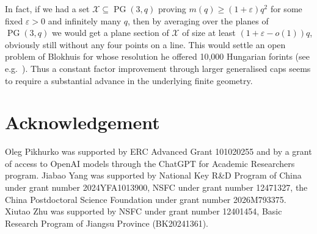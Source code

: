 \documentclass[12pt,a4paper]{article}
\numberwithin{equation}{section}
\theoremstyle{definition}
\theoremstyle{remark}
\newcommand{\hide}[1]{{\color{DarkGreen}#1}}
\renewcommand{\hide}[1]{}
\begin{document}
 \hide{Some details:
 	Hill~\cite{Hill78} improved it to $2q^2-\alpha_q$ where $\alpha_q$ comes from an explicit (but messy) inequality and is linear in $q$, specifically he showed that
 	\begin{equation}\label{eq:H4-Hill-bound}
 		m(q)\le2q^2-\frac{\sqrt{17}-3}{2}\,q+O(1)
 		\quad(q\to\infty);
 	\end{equation}
 	
 	
 	In the other direction, results on cubic surfaces imply
 	\begin{equation}\label{eq:H4-cubic-cap}
 		m(q)\ge(q+1)^2
 		\quad\text{for every prime power }q.
 	\end{equation}
 	To see this, Theorem~1.1 of Loughran and Trepalin~\cite{LoughranTrepalin20} gives a smooth cubic surface $\mathcal X$ of Frobenius class $C_{12}$ over every $\mathbb F_q$. The point-count formula and Table~7.1 of Banwait, Fit\'e and Loughran~\cite{BanwaitFiteLoughran19} give $| \mathcal X(\mathbb F_q)|=q^2+2q+1$. The same table gives Frobenius orbits of lengths $3,6,6,6,6$ on its 27 geometric lines, so none of these lines is defined over $\mathbb F_q$. Restricting the defining homogeneous cubic to any $\mathbb F_q$-line therefore gives a non-zero homogeneous binary cubic, which has at most three projective zeros. Thus $ \mathcal X(\mathbb F_q)\subseteq\operatorname{PG}(3,q)$ has no four collinear points, proving~\eqref{eq:H4-cubic-cap}.
 }%
 
 
In fact, if we had a set $ \mathcal X\subseteq \operatorname{PG}(3,q)$ proving $m(q)\ge (1+\varepsilon)q^2$ for some fixed $\varepsilon>0$ and infinitely many $q$, then by averaging over the planes of $\operatorname{PG}(3,q)$ we would get a plane section of $ \mathcal X$ of size at least $(1+\varepsilon-o(1))q$, obviously still
without any four points on a line. This would settle an open problem of Blokhuis for whose resolution he offered 10,000 Hungarian forints (see e.g.~\cite[Section 5, Problem 2]{BallHirschfeld05}).  Thus a constant factor improvement through larger generalised caps seems to require a substantial advance in the underlying finite geometry.





\section*{Acknowledgement}
\noindent 
Oleg Pikhurko was supported 
by ERC Advanced Grant 101020255 and by a grant of access to OpenAI models through the ChatGPT for Academic Researchers program.
Jiabao Yang was supported by National Key R\&D Program of China under grant number 2024YFA1013900, 
NSFC under grant number 12471327, the China Postdoctoral Science Foundation under grant number 2026M793375.
Xiutao Zhu was supported by NSFC under grant number 12401454, Basic Research Program of Jiangsu Province (BK20241361).
\end{document}
